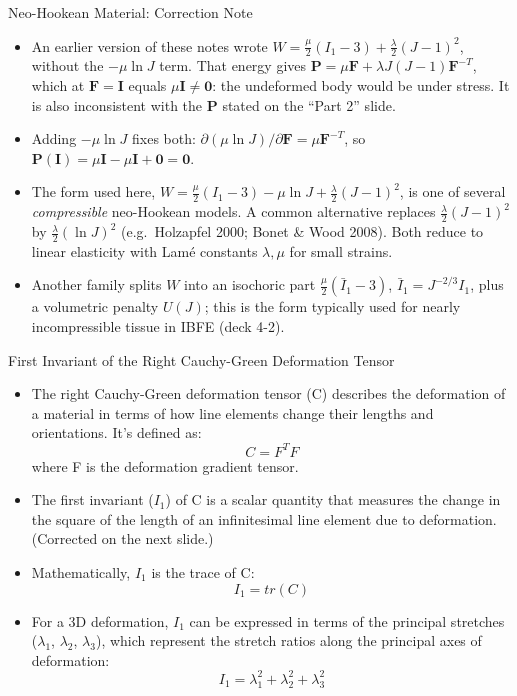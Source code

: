 \documentclass{beamer}
\begin{document}
\begin{frame}{Neo-Hookean Material: Correction Note}
\begin{itemize}
\item An earlier version of these notes wrote $W = \frac{\mu}{2}(I_1-3) + \frac{\lambda}{2}(J-1)^2$, without the $-\mu\ln J$ term. That energy gives $\mathbf{P} = \mu\mathbf{F} + \lambda J(J-1)\mathbf{F}^{-T}$, which at $\mathbf{F}=\mathbf{I}$ equals $\mu\mathbf{I}\neq\mathbf{0}$: the undeformed body would be under stress. It is also inconsistent with the $\mathbf{P}$ stated on the ``Part 2'' slide.
\item Adding $-\mu\ln J$ fixes both: $\partial(\mu\ln J)/\partial\mathbf{F} = \mu\mathbf{F}^{-T}$, so $\mathbf{P}(\mathbf{I}) = \mu\mathbf{I} - \mu\mathbf{I} + \mathbf{0} = \mathbf{0}$.
\item The form used here, $W=\frac{\mu}{2}(I_1-3)-\mu\ln J+\frac{\lambda}{2}(J-1)^2$, is one of several \emph{compressible} neo-Hookean models. A common alternative replaces $\frac{\lambda}{2}(J-1)^2$ by $\frac{\lambda}{2}(\ln J)^2$ (e.g.\ Holzapfel 2000; Bonet \& Wood 2008). Both reduce to linear elasticity with Lam\'e constants $\lambda,\mu$ for small strains.
\item Another family splits $W$ into an isochoric part $\frac{\mu}{2}(\bar I_1-3)$, $\bar I_1 = J^{-2/3}I_1$, plus a volumetric penalty $U(J)$; this is the form typically used for nearly incompressible tissue in IBFE (deck 4-2).
\end{itemize}
\end{frame}

\begin{frame}{First Invariant of the Right Cauchy-Green Deformation Tensor}
\begin{itemize}
\item The right Cauchy-Green deformation tensor (C) describes the deformation of a material in terms of how line elements change their lengths and orientations. It's defined as:
\begin{equation*}
C = F^T F
\end{equation*}
where F is the deformation gradient tensor.
\item The first invariant ($I_1$) of C is a scalar quantity that measures the change in the square of the length of an infinitesimal line element due to deformation. (Corrected on the next slide.)
\item Mathematically, $I_1$ is the trace of C:
\begin{equation*}
I_1 = tr(C)
\end{equation*}
\item For a 3D deformation, $I_1$ can be expressed in terms of the principal stretches ($\lambda_1$, $\lambda_2$, $\lambda_3$), which represent the stretch ratios along the principal axes of deformation:
\begin{equation*}
I_1 = \lambda_1^2 + \lambda_2^2 + \lambda_3^2
\end{equation*}
\end{itemize}
\end{frame}
\end{document}
